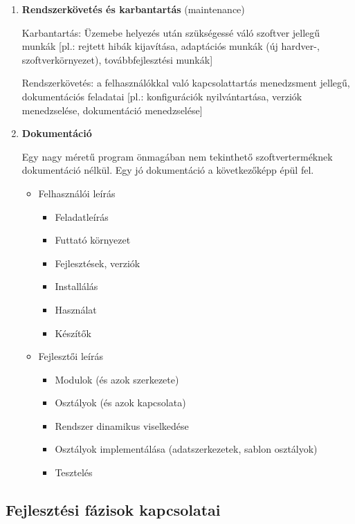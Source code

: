 \documentclass[12pt,margin=0px]{article}
\begin{document}
\begin{enumerate}
			\item \textbf{Rendszerkövetés és karbantartás} (maintenance)
			
			Karbantartás: Üzemebe helyezés után szükségessé váló szoftver jellegű munkák [pl.: rejtett hibák kijavítása, adaptációs munkák (új hardver-, szoftverkörnyezet), továbbfejlesztési munkák]
			
			Rendszerkövetés: a felhasználókkal való kapcsolattartás menedzsment jellegű, dokumentációs feladatai [pl.: konfigurációk nyilvántartása, verziók menedzselése, dokumentáció menedzselése]
			
			\item \textbf{Dokumentáció}
			
			Egy nagy méretű program önmagában nem tekinthető szoftverterméknek
			dokumentáció nélkül. Egy jó dokumentáció a következőképp épül fel.
			\begin{itemize}
				\item Felhasználói leírás
					\begin{itemize}
						\item Feladatleírás
						\item Futtató környezet
						\item Fejlesztések, verziók
						\item Installálás
						\item Használat
						\item Készítők
					\end{itemize}
				\item Fejlesztői leírás
					\begin{itemize}
						\item Modulok (és azok szerkezete)
						\item Osztályok (és azok kapcsolata)
						\item Rendszer dinamikus viselkedése
						\item Osztályok implementálása (adatszerkezetek, sablon osztályok)
						\item Tesztelés
					\end{itemize}
			\end{itemize}	
		\end{enumerate}
		
		\subsection*{Fejlesztési fázisok kapcsolatai}
		
\end{document}
